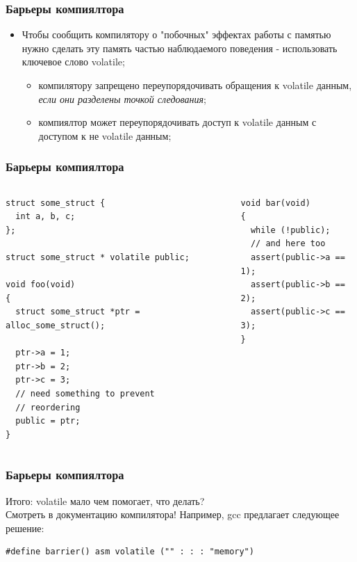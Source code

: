 \begin{frame}
\frametitle{Барьеры компиялтора}

\begin{itemize}
  \item Чтобы сообщить компилятору о "побочных" эффектах работы с памятью
        нужно сделать эту память частью наблюдаемого поведения - использовать
        ключевое слово volatile;
        \begin{itemize}
          \item компилятору запрещено переупорядочивать обращения к volatile
                данным, \emph{если они разделены точкой следования};
          \item компиялтор может переупорядочивать доступ к volatile данным с
                доступом к не volatile данным;
        \end{itemize}
\end{itemize}
\end{frame}

\begin{frame}[fragile]
\frametitle{Барьеры компиялтора}

\begin{columns}[T]
  \begin{column}{.45\linewidth}
    \begin{lstlisting}
struct some_struct {
  int a, b, c;
};

struct some_struct * volatile public;

void foo(void)
{
  struct some_struct *ptr = alloc_some_struct();

  ptr->a = 1;
  ptr->b = 2;
  ptr->c = 3;
  // need something to prevent
  // reordering
  public = ptr;
}
    \end{lstlisting}
  \end{column}
  \begin{column}{.45\linewidth}
    \begin{lstlisting}
void bar(void)
{
  while (!public);
  // and here too
  assert(public->a == 1);
  assert(public->b == 2);
  assert(public->c == 3);
}
    \end{lstlisting}
  \end{column}
\end{columns}
\end{frame}

\begin{frame}[fragile]
\frametitle{Барьеры компиялтора}

Итого: volatile мало чем помогает, что делать? \\
Смотреть в документацию компилятора! Например, gcc предлагает
следующее решение:

\begin{lstlisting}
#define barrier() asm volatile ("" : : : "memory")
\end{lstlisting}
\end{frame}

